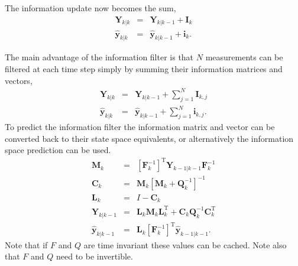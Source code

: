 The information update now becomes the sum,
\begin{eqnarray*}
    \textbf{Y}_{k|k} &=& \textbf{Y}_{k|k-1} + \textbf{I}_{k}\\
    \hat{\textbf{y}}_{k|k} &=& \hat{\textbf{y}}_{k|k-1} + \textbf{i}_{k}.
\end{eqnarray*}

The main advantage of the information filter is that $N$ measurements can be filtered at each time step simply by summing their information matrices and vectors,
\begin{eqnarray*}
    \textbf{Y}_{k|k} &=& \textbf{Y}_{k|k-1} + \sum_{j=1}^N \textbf{I}_{k,j} \\
    \hat{\textbf{y}}_{k|k} &=& \hat{\textbf{y}}_{k|k-1} + \sum_{j=1}^N \textbf{i}_{k,j}.
\end{eqnarray*}
To predict the information filter the information matrix and vector can be converted back to their state space equivalents, or alternatively the information space prediction can be used.
\begin{eqnarray*}
    \textbf{M}_{k} &=& [\textbf{F}_{k}^{-1}]^{\text{T}} \textbf{Y}_{k-1|k-1} \textbf{F}_{k}^{-1} \\
    \textbf{C}_{k} &=& \textbf{M}_{k} [\textbf{M}_{k}+\textbf{Q}_{k}^{-1}]^{-1} \\
    \textbf{L}_{k} &=& I - \textbf{C}_{k} \\
    \textbf{Y}_{k|k-1} &=& \textbf{L}_{k} \textbf{M}_{k} \textbf{L}_{k}^{\text{T}} + \textbf{C}_{k} \textbf{Q}_{k}^{-1} \textbf{C}_{k}^{\text{T}} \\
    \hat{\textbf{y}}_{k|k-1} &=& \textbf{L}_{k} [\textbf{F}_{k}^{-1}]^{\text{T}}\hat{\textbf{y}}_{k-1|k-1}.
\end{eqnarray*}
Note that if $F$ and $Q$ are time invariant these values can be cached. Note also that $F$ and $Q$ need to be invertible.

